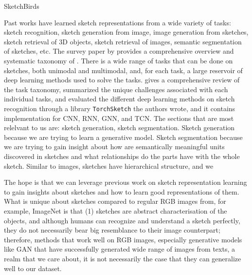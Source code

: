 SketchBirds

Past works have learned sketch representations from a wide variety of tasks: sketch recognition, sketch generation from image, image generation from sketches, sketch retrieval of 3D objects, sketch retrieval of images, semantic segmentation of sketches, etc. 
The survey paper by \citet{sketchsurvey} provides a comprehensive overview and systematic taxonomy of . 
There is a wide range of tasks that can be done on sketches, both unimodal and multimodal, and, for each task, a large reservoir of deep learning methods used to solve the tasks. 
\citet{sketchsurvey} gives a comprehensive review of the task taxonomy, summarized the unique challenges associated with each individual tasks, and evaluated the different deep learning methods on sketch recognition through a library \texttt{TorchSketch} the authors wrote, and it contains implementation for CNN, RNN, GNN, and TCN. The sections that are most relelvant to us are: sketch generation, sketch segmentation. Sketch generation because we are trying to learn a generative model. Sketch segmentation because we are trying to gain insight about how are semantically meaningful units discovered in sketches and what relationships do the parts have with the whole sketch.      
Similar to images, sketches have hierarchical structure, and we 

The hope is that we can leverage previous work on sketch representation learning to gain insights about sketches and how to learn good representations of them. What is unique about sketches compared to regular RGB images from, for example, ImageNet is that (1) sketches are abstract characterisation of the objects, and although humans can recognize and understand a sketch perfectly, they do not necessarily bear big resemblance to their image counterpart; therefore, methods that work well on RGB images, especially generative models like GAN that have successfully generated wide range of images from texts, a realm that we care about, it is not necessarily the case that they can generalize well to our dataset.  




